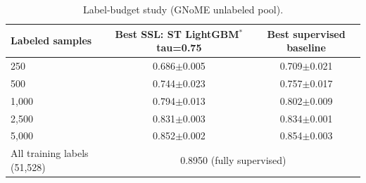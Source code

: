 \begin{table}[H]
\centering\small
\begin{tabular}{lcc}
\toprule
Labeled samples & Best SSL: ST LightGBM$^*$ tau=0.75 & Best supervised baseline\\
\midrule
250 & 0.686$\pm$0.005 & 0.709$\pm$0.021 \\
500 & 0.744$\pm$0.023 & 0.757$\pm$0.017 \\
1,000 & 0.794$\pm$0.013 & 0.802$\pm$0.009 \\
2,500 & 0.831$\pm$0.003 & 0.834$\pm$0.001 \\
5,000 & 0.852$\pm$0.002 & 0.854$\pm$0.003 \\
\midrule
All training labels (51,528) & \multicolumn{2}{c}{0.8950 (fully supervised)}\\
\bottomrule
\end{tabular}
\caption*{Label-budget study (GNoME unlabeled pool).}
\end{table}
